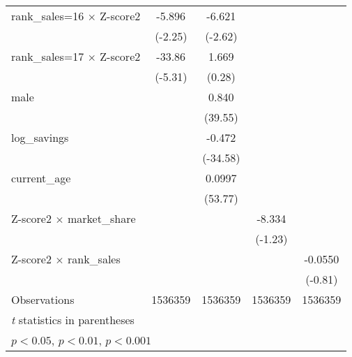 {\begin{tabular}{l*{4}{c}}
rank\_sales=16 $\times$ Z-score2&      -5.896\sym{*}  &      -6.621\sym{**} &                     &                     \\
                    &     (-2.25)         &     (-2.62)         &                     &                     \\
rank\_sales=17 $\times$ Z-score2&      -33.86\sym{***}&       1.669         &                     &                     \\
                    &     (-5.31)         &      (0.28)         &                     &                     \\
male                &                     &       0.840\sym{***}&                     &                     \\
                    &                     &     (39.55)         &                     &                     \\
log\_savings         &                     &      -0.472\sym{***}&                     &                     \\
                    &                     &    (-34.58)         &                     &                     \\
current\_age         &                     &      0.0997\sym{***}&                     &                     \\
                    &                     &     (53.77)         &                     &                     \\
Z-score2 $\times$ market\_share&                     &                     &      -8.334         &                     \\
                    &                     &                     &     (-1.23)         &                     \\
Z-score2 $\times$ rank\_sales&                     &                     &                     &     -0.0550         \\
                    &                     &                     &                     &     (-0.81)         \\
\hline
Observations        &     1536359         &     1536359         &     1536359         &     1536359         \\
\hline\hline
\multicolumn{5}{l}{\footnotesize \textit{t} statistics in parentheses}\\
\multicolumn{5}{l}{\footnotesize \sym{*} \(p<0.05\), \sym{**} \(p<0.01\), \sym{***} \(p<0.001\)}\\
\end{tabular}
}
